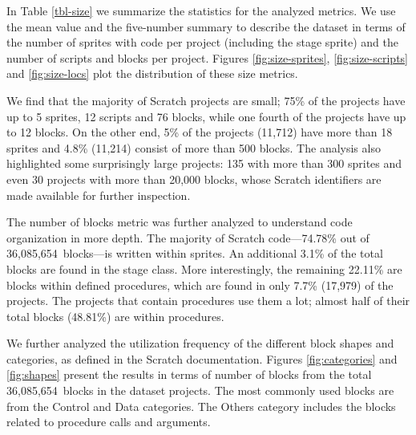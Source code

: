\documentclass{sig-alternate-05-2015}
\newcommand{\nLOC}{36,085,654}
\begin{document}
In Table \ref{tbl-size} we summarize the statistics for the analyzed metrics. We use the mean value and the five-number summary to describe the dataset in terms of the number of sprites with code per project (including the stage sprite) and the number of scripts and blocks per project. Figures \ref{fig:size-sprites}, \ref{fig:size-scripts} and \ref{fig:size-locs} plot the distribution of these size metrics.

We find that the majority of Scratch projects are small; 75\% of the projects have up to 5 sprites, 12 scripts and 76 blocks, while one fourth of the projects have up to 12 blocks. On the other end, 5\% of the projects (11,712) have more than 18 sprites and 4.8\% (11,214) consist of more than 500 blocks. The analysis also highlighted some surprisingly large projects: 135 with more than 300 sprites and even 30 projects with more than 20,000 blocks, whose Scratch identifiers are made available for further inspection.\footnotemark[\ref{repo}]

The number of blocks metric was further analyzed to understand code organization in more depth. The majority of Scratch code---74.78\% out of \nLOC~blocks---is written within sprites. An additional 3.1\% of the total blocks are found in the stage class. More interestingly, the remaining 22.11\% are blocks within defined procedures, which are found in only 7.7\% (17,979) of the projects. The projects that contain procedures use them a lot; almost half of their total blocks (48.81\%) are within procedures.

We further analyzed the utilization frequency of the different block shapes and categories, as defined in the Scratch documentation. Figures \ref{fig:categories} and \ref{fig:shapes} present the results in terms of number of blocks from the total \nLOC~blocks in the dataset projects. The most commonly used blocks are from the Control and Data categories. The Others category includes the blocks related to procedure calls and arguments.
\end{document}
